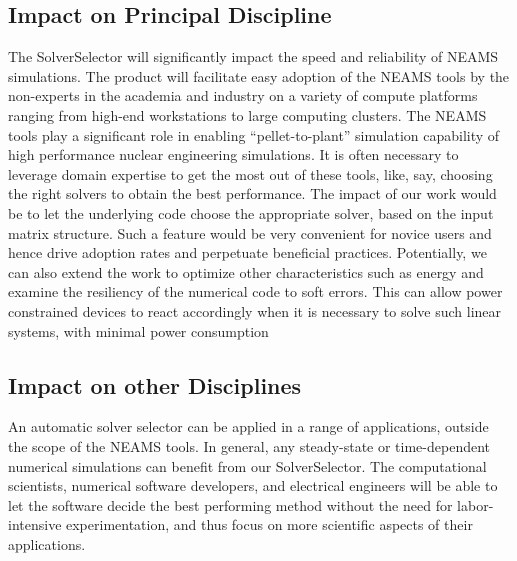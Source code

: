 \subsection{Impact on Principal Discipline}
The SolverSelector will significantly impact the speed and reliability of NEAMS simulations. The product will facilitate easy adoption of the NEAMS tools by the non-experts in the academia and industry on a variety of compute platforms ranging from high-end workstations to large computing clusters. 
The NEAMS tools play a significant role in enabling “pellet-to-plant” simulation capability of high performance nuclear engineering simulations. It is often necessary to leverage domain expertise to get the most out of these tools, like, say, choosing the right solvers to obtain the best performance. The impact of our work would be to let the underlying code choose the appropriate solver, based on the input matrix structure. Such a feature would be very convenient for novice users and hence drive adoption rates and perpetuate beneficial practices.
Potentially, we can also extend the work to optimize other characteristics such as energy and examine the resiliency of the numerical code to soft errors. This can allow power constrained devices to react accordingly when it is necessary to solve such linear systems, with minimal power consumption

\subsection{Impact on other Disciplines}
An automatic solver selector can be applied in a range of applications, outside the scope of the NEAMS tools. In general, any steady-state or time-dependent numerical simulations can benefit from our SolverSelector. The computational scientists, numerical software developers, and electrical engineers will be able to let the software decide the best performing method without the need for labor-intensive experimentation, and thus focus on more scientific aspects of their applications.
